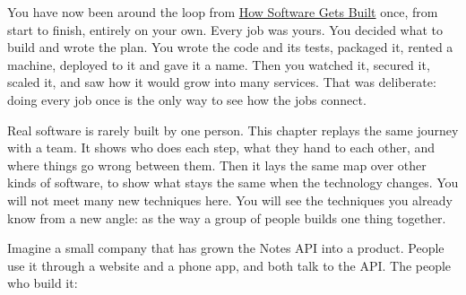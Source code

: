 \label{ch:the-same-process-in-a-team}


\chapterrule

You have now been around the loop from \hyperref[ch:how-software-gets-built]{How Software Gets Built} once, from start to finish, entirely on your own. Every job was yours. You decided what to build and wrote the plan. You wrote the code and its tests, packaged it, rented a machine, deployed to it and gave it a name. Then you watched it, secured it, scaled it, and saw how it would grow into many services. That was deliberate: doing every job once is the only way to see how the jobs connect.

Real software is rarely built by one person. This chapter replays the same journey with a team. It shows who does each step, what they hand to each other, and where things go wrong between them. Then it lays the same map over other kinds of software, to show what stays the same when the technology changes. You will not meet many new techniques here. You will see the techniques you already know from a new angle: as the way a group of people builds one thing together.

\label{the-same-process-in-a-team:the-team}

Imagine a small company that has grown the Notes API into a product. People use it through a website and a phone app, and both talk to the API. The people who build it:


